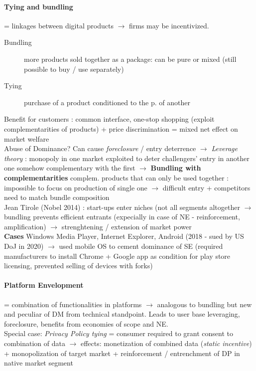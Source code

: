 \documentclass[10pt]{article}
\begin{document}
\paragraph{Tying and bundling} = linkages between digital products $\rightarrow$ firms may be incentivized.
\begin{description}
    \item[Bundling] more products sold together as a package: can be pure or mixed (still possible to buy / use separately)
    \item[Tying] purchase of a product conditioned to the p. of another
\end{description}
Benefit for customers : common interface, one-stop shopping (exploit complementarities of products) + price discrimination = mixed net effect on market welfare
\\Abuse of Dominance? Can cause \textit{foreclosure} / entry deterrence $\rightarrow$ \textit{Leverage theory} : monopoly in one market exploited to deter challengers' entry in another one somehow complementary with the first $\rightarrow$ \textbf{Bundling with complementarities} complem. products that can only be used together : impossible to focus on production of single one $\rightarrow$ difficult entry + competitors need to match bundle composition
\\Jean Tirole (Nobel 2014) : start-ups enter niches (not all segments altogether $\rightarrow$ bundling prevents efficient entrants (expecially in case of NE - reinforcement, amplification) $\rightarrow$ strenghtening / extension of market power
\\\textbf{Cases} Windows Media Player, Internet Explorer, Android (2018 - sued by US DoJ in 2020) $\rightarrow$ used mobile OS to cement dominance of SE (required manufacturers to install Chrome + Google app as condition for play store licensing, prevented selling of devices with forks)

\paragraph{Platform Envelopment} = combination of functionalities in platforms $\rightarrow$ analogous to bundling but new and peculiar of DM from technical standpoint. Leads to user base leveraging, foreclosure, benefits from economies of scope and NE.
\\Special case: \textit{Privacy Policy tying} = consumer required to grant consent to combination of data $\rightarrow$ effects: monetization of combined data (\textit{static incentive}) + monopolization of target market + reinforcement / entrenchment of DP in native market segment
\end{document}
